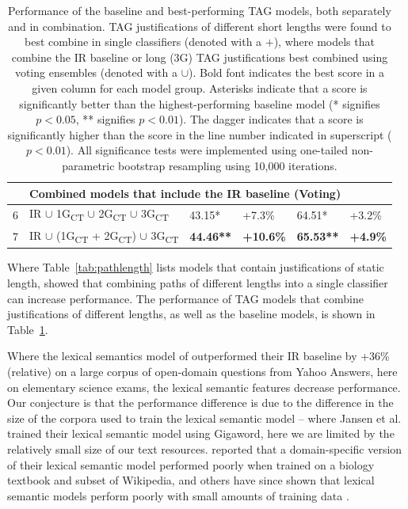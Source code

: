 {\begin{table}[t]
\begin{center}
\begin{tabular}{p{0.3mm}p{55mm}llll}
\\
\hline
& \multicolumn{5}{l}{Combined models that include the IR baseline (Voting)}\\
\hline
6 & IR $\cup$ 1G\textsubscript{CT} $\cup$ 2G\textsubscript{CT} $\cup$ 3G\textsubscript{CT} 			& 43.15*			& +7.3\%			& 64.51*		& +3.2\%	  \\
7 & IR $\cup$ (1G\textsubscript{CT} + 2G\textsubscript{CT}) $\cup$ 3G\textsubscript{CT} 			& {\bf 44.46**}		& {\bf +10.6\%}		& {\bf 65.53**} 		& {\bf +4.9\%}	  \\

\hline
\end{tabular}
    \caption{{
Performance of the baseline and best-performing TAG models, both separately and in combination. TAG justifications of different short lengths were found to best combine in single classifiers (denoted with a $+$), where models that combine the IR baseline or long (3G) TAG justifications best combined using voting ensembles (denoted with a $\cup$). Bold font indicates the best score in a given column for each model group. Asterisks indicate that a score is significantly better than the highest-performing baseline model (* signifies $p < 0.05$, ** signifies $p < 0.01$).  The dagger indicates that a score is significantly higher than the score in the line number indicated in superscript ($p < 0.01$). All significance tests were implemented using one-tailed non-parametric bootstrap resampling using 10,000 iterations. }}
\label{tab:combinedmodels}
\end{center}
\end{table}

Where Table~\ref{tab:pathlength} lists models that contain justifications of static length, \citet{fried2015higher} showed that combining paths of different lengths into a single classifier can increase performance.  The performance of TAG models that combine justifications of different lengths, as well as the baseline models, is shown in Table~\ref{tab:combinedmodels}.

{} Where the lexical semantics model of \citet{jansen14} outperformed their IR baseline by +36\% (relative) on a large corpus of open-domain questions from Yahoo Answers, here on elementary science exams, the lexical semantic features decrease performance.  Our conjecture is that the performance difference is due to the difference in the size of the corpora used to train the lexical semantic model -- where Jansen et al. trained their lexical semantic model using Gigaword, here we are limited by the relatively small size of our text resources.  \citet{jansen14} reported that a domain-specific version of their lexical semantic model performed poorly when trained on a biology textbook and subset of Wikipedia, and others have since shown that lexical semantic models perform poorly with small amounts of training data \citep[][see also Chapter \ref{chapter:naacl2015}]{sharp-EtAl:2015:NAACL-HLT}. 

}
